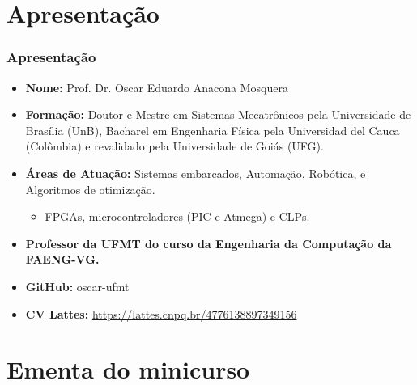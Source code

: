\documentclass[aspectratio=169]{beamer}
\begin{document}
\section{Apresentação}
\begin{frame}
	
	\frametitle{Apresentação}
	\begin{itemize}
		\justifying
		\item \textbf{Nome:} Prof. Dr. Oscar Eduardo Anacona Mosquera
		\item \textbf{Formação:} Doutor e Mestre em Sistemas Mecatrônicos pela Universidade de Brasília (UnB), Bacharel em Engenharia Física pela Universidad del Cauca (Colômbia) e revalidado pela Universidade de Goiás (UFG).
		\item \textbf{Áreas de Atuação:} Sistemas embarcados, Automação, Robótica, e Algoritmos de otimização.
		\begin{itemize}
			\item FPGAs, microcontroladores (PIC e Atmega) e CLPs.
		\end{itemize}
		
		\item \textbf{Professor da UFMT do curso da Engenharia da Computação da FAENG-VG.}

		\item \textbf{GitHub:} oscar-ufmt
		\item \textbf{CV Lattes:} \url{https://lattes.cnpq.br/4776138897349156}
	\end{itemize}
\end{frame}

\section{Ementa do minicurso}
\end{document}
